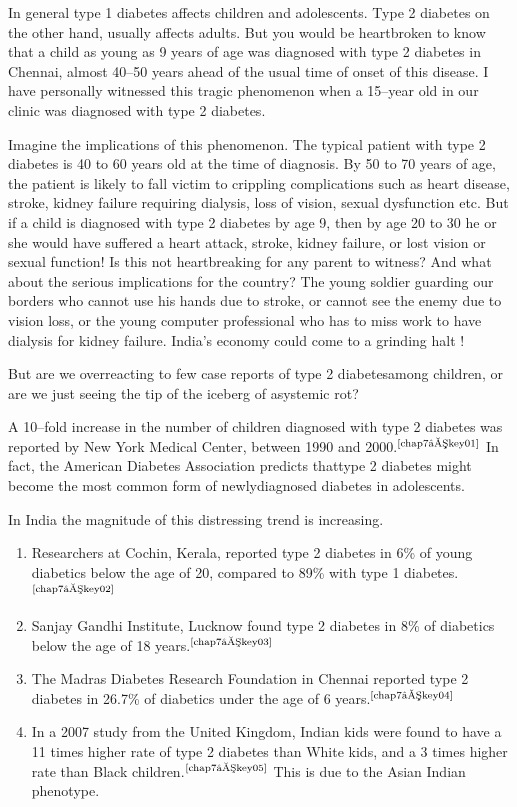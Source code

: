 In general type 1 diabetes affects children and adolescents. Type 2 diabetes on the other hand, usually affects adults. But you would be heartbroken to know that a child as young as 9 years of age was diagnosed with type 2 diabetes in Chennai, almost 40–50 years ahead of the usual time of onset of this disease. I have personally witnessed this tragic phenomenon when a 15–year old in our clinic was diagnosed with type 2 diabetes.


Imagine the implications of this phenomenon. The typical patient with type 2 diabetes is 40 to 60 years old at the time of diagnosis. By 50 to 70 years of age, the patient is likely to fall victim to crippling compli\-cations such as heart disease, stroke, kidney failure requiring dialysis, loss of vision, sexual dysfunction etc. But if a child is dia\-gnosed with type 2 diabetes by age 9, then by age 20 to 30 he or she would have suffered a heart attack, stroke, kidney failure, or lost vision or sexual function! Is this not heartbreaking for any parent to witness? And what about the serious implications for the country? The young soldier gua\-rding our borders who cannot use his hands due to stroke, or cannot see the enemy due to vision loss, or the young computer professional who has to miss work to have dialysis for kidney failure. India’s eco\-nomy could come to a grinding halt !


But are we overreacting to few case reports of type 2 diabetes\break among children, or are we just seeing the tip of the iceberg of a\break systemic rot?

\setlength{\parskip}{.5em}
A 10–fold increase in the number of children diagnosed with type 2 diabetes was reported by New York Medical Center, between 1990 and 2000.$^{\text{\cite{chap7–key01}}}$ In fact, the American Diabetes Association predicts that\break type 2 diabetes might become the most common form of newly\break diagnosed diabetes in adolescents.

\noindent In India the magnitude of this distressing trend is increasing.

\begin{enumerate}[•]
\itemsep=0pt
\item Researchers at Cochin, Kerala, reported type 2 diabetes in 6\% of young diabetics below the age of 20, compared to 89\% with type 1 diabetes.$^{\text{\cite{chap7–key02}}}$
\item Sanjay Gandhi Institute, Lucknow found type 2 diabetes in 8\% of dia\-betics below the age of 18 years.$^{\text{\cite{chap7–key03}}}$
\item The Madras Diabetes Research Foundation in Chennai reported type 2 diabetes in 26.7\% of diabetics under the age of 6 years.$^{\text{\cite{chap7–key04}}}$
\item In a 2007 study from the United Kingdom, Indian kids were found to have a 11 times higher rate of type 2 diabetes than White kids, and a 3 times higher rate than Black children.$^{\text{\cite{chap7–key05}}}$ This is due to the Asian Indian phenotype.
 \end{enumerate}



